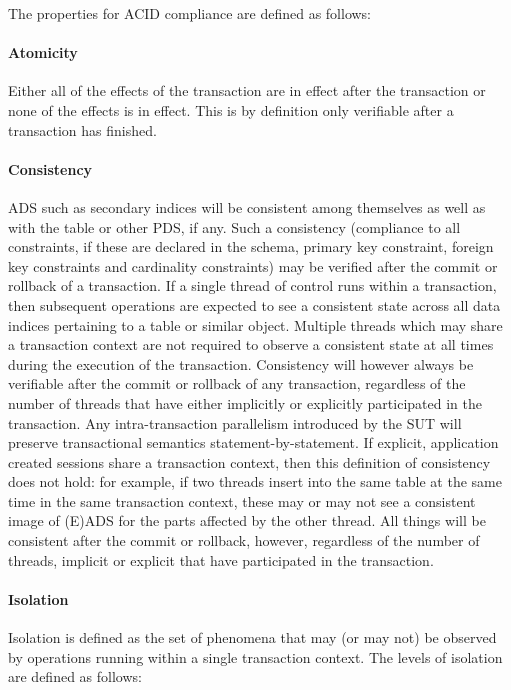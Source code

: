 The properties for ACID compliance are defined as follows:

\paragraph{Atomicity}
Either all of the effects of the transaction are in effect after the transaction or none of the effects
is in effect. This is by definition only verifiable after a transaction has finished.

\paragraph{Consistency}
ADS such as secondary indices will be consistent among themselves as well as with the table or other PDS, if any. Such a consistency (compliance to all constraints, if these are declared in the schema, \eg primary key constraint, foreign key constraints and cardinality constraints) may be verified
after the commit or rollback of a transaction. If a single thread of control runs within a transaction, then
subsequent operations are expected to see a consistent state across all data indices pertaining to a table
or similar object. Multiple threads which may share a transaction context are not required to observe a
consistent state at all times during the execution of the transaction. Consistency will however always be
verifiable after the commit or rollback of any transaction, regardless of the number of threads that have
either implicitly or explicitly participated in the transaction. Any intra-transaction parallelism introduced
by the SUT will preserve transactional semantics statement-by-statement. If explicit, application created
sessions share a transaction context, then this definition of consistency does not hold: for example, if
two threads insert into the same table at the same time in the same transaction context, these may or may
not see a consistent image of (E)ADS for the parts affected by the other thread. All things will be
consistent after the commit or rollback, however, regardless of the number of threads, implicit or explicit
that have participated in the transaction.

\paragraph{Isolation}
Isolation is defined as the set of phenomena that may (or may not) be observed by operations running within a single transaction context. The levels of isolation are defined as follows:

